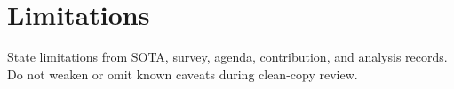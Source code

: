 \section{Limitations}

State limitations from SOTA, survey, agenda, contribution, and analysis records.
Do not weaken or omit known caveats during clean-copy review.

